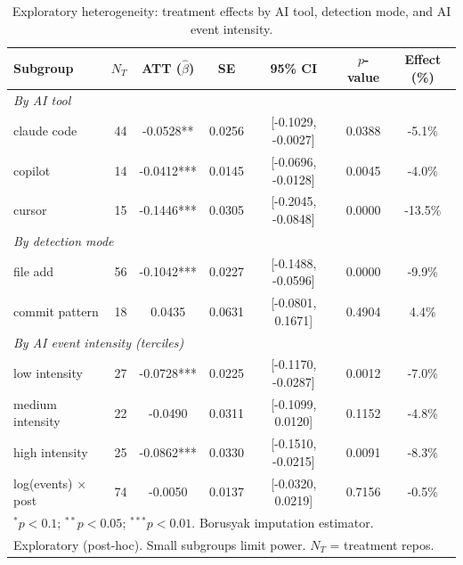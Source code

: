 \begin{table}[t]
\centering
\caption{Exploratory heterogeneity: treatment effects by AI tool, detection mode, and AI event intensity.}
\label{tab:tool_heterogeneity}
\begin{tabular}{lrccccc}
\toprule
Subgroup & $N_T$ & ATT ($\hat{\beta}$) & SE & 95\% CI & $p$-value & Effect (\%) \\
\midrule
\multicolumn{7}{l}{\textit{By AI tool}} \\
claude code & 44 & -0.0528** & 0.0256 & [-0.1029, -0.0027] & 0.0388 & -5.1\% \\
copilot & 14 & -0.0412*** & 0.0145 & [-0.0696, -0.0128] & 0.0045 & -4.0\% \\
cursor & 15 & -0.1446*** & 0.0305 & [-0.2045, -0.0848] & 0.0000 & -13.5\% \\
\midrule
\multicolumn{7}{l}{\textit{By detection mode}} \\
file add & 56 & -0.1042*** & 0.0227 & [-0.1488, -0.0596] & 0.0000 & -9.9\% \\
commit pattern & 18 & 0.0435 & 0.0631 & [-0.0801, 0.1671] & 0.4904 & 4.4\% \\
\midrule
\multicolumn{7}{l}{\textit{By AI event intensity (terciles)}} \\
low intensity & 27 & -0.0728*** & 0.0225 & [-0.1170, -0.0287] & 0.0012 & -7.0\% \\
medium intensity & 22 & -0.0490 & 0.0311 & [-0.1099, 0.0120] & 0.1152 & -4.8\% \\
high intensity & 25 & -0.0862*** & 0.0330 & [-0.1510, -0.0215] & 0.0091 & -8.3\% \\
log(events) $\times$ post & 74 & -0.0050 & 0.0137 & [-0.0320, 0.0219] & 0.7156 & -0.5\% \\
\bottomrule
\multicolumn{7}{l}{\footnotesize $^{*}p<0.1$; $^{**}p<0.05$; $^{***}p<0.01$. Borusyak imputation estimator.} \\
\multicolumn{7}{l}{\footnotesize Exploratory (post-hoc). Small subgroups limit power. $N_T$ = treatment repos.} \\
\end{tabular}
\end{table}
